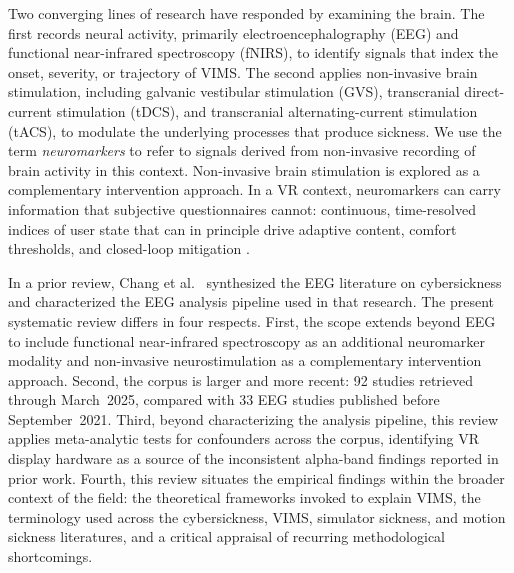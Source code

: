 Two converging lines of research have responded by examining the brain.
The first records neural activity, primarily electroencephalography (EEG) and functional near-infrared spectroscopy (fNIRS), to identify signals that index the onset, severity, or trajectory of VIMS.
The second applies non-invasive brain stimulation, including galvanic vestibular stimulation (GVS), transcranial direct-current stimulation (tDCS), and transcranial alternating-current stimulation (tACS), to modulate the underlying processes that produce sickness.
We use the term \emph{neuromarkers} to refer to signals derived from non-invasive recording of brain activity in this context.
Non-invasive brain stimulation is explored as a complementary intervention approach.
In a VR context, neuromarkers can carry information that subjective questionnaires cannot: continuous, time-resolved indices of user state that can in principle drive adaptive content, comfort thresholds, and closed-loop mitigation \cite{uyanCDMSRealtimeSystem2024, yamamuraHemodynamicVRAdaptingUsers2021}.

In a prior review, Chang et al.~\cite{changBrainActivityCybersickness2023} synthesized the EEG literature on cybersickness and characterized the EEG analysis pipeline used in that research.
The present systematic review differs in four respects.
First, the scope extends beyond EEG to include functional near-infrared spectroscopy as an additional neuromarker modality and non-invasive neurostimulation as a complementary intervention approach.
Second, the corpus is larger and more recent: 92 studies retrieved through March~2025, compared with 33 EEG studies published before September~2021.
Third, beyond characterizing the analysis pipeline, this review applies meta-analytic tests for confounders across the corpus, identifying VR display hardware as a source of the inconsistent alpha-band findings reported in prior work.
Fourth, this review situates the empirical findings within the broader context of the field: the theoretical frameworks invoked to explain VIMS, the terminology used across the cybersickness, VIMS, simulator sickness, and motion sickness literatures, and a critical appraisal of recurring methodological shortcomings.

